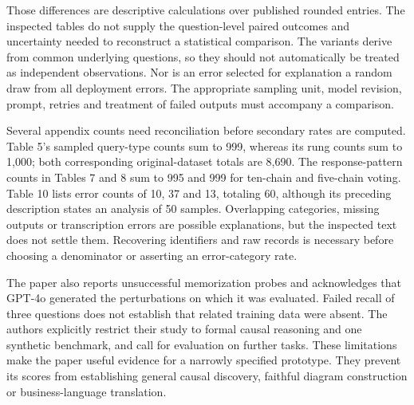 Those differences are descriptive calculations over published rounded entries.
The inspected tables do not supply the question-level paired outcomes and
uncertainty needed to reconstruct a statistical comparison. The variants derive
from common underlying questions, so they should not automatically be treated
as independent observations. Nor is an error selected for explanation a random
draw from all deployment errors. The appropriate sampling unit, model revision,
prompt, retries and treatment of failed outputs must accompany a comparison.

Several appendix counts need reconciliation before secondary rates are computed.
Table 5's sampled query-type counts sum to 999, whereas its rung counts sum to
1,000; both corresponding original-dataset totals are 8,690. The response-pattern
counts in Tables 7 and 8 sum to 995 and 999 for ten-chain and five-chain voting.
Table 10 lists error counts of 10, 37 and 13, totaling 60, although its preceding
description states an analysis of 50 samples. Overlapping categories, missing
outputs or transcription errors are possible explanations, but the inspected
text does not settle them. Recovering identifiers and raw records is necessary
before choosing a denominator or asserting an error-category rate.
\citep{exec21_prophets,exec21_prophets_reference}

The paper also reports unsuccessful memorization probes and acknowledges that
GPT-4o generated the perturbations on which it was evaluated. Failed recall of
three questions does not establish that related training data were absent.
The authors explicitly restrict their study to formal causal reasoning and one
synthetic benchmark, and call for evaluation on further tasks. These limitations
make the paper useful evidence for a narrowly specified prototype. They prevent
its scores from establishing general causal discovery, faithful diagram
construction or business-language translation.~\citep{exec21_prophets}


